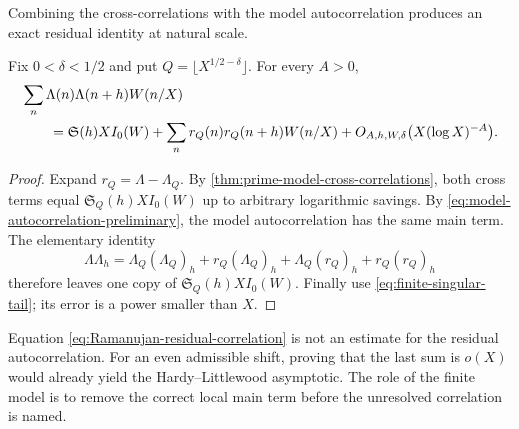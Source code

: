 Combining the cross-correlations with the model autocorrelation produces
an exact residual identity at natural scale.

\begin{theorem}
\label{thm:ramanujan-calibrated-correlation}
Fix $0<\delta<1/2$ and put $Q=\lfloor X^{1/2-\delta}\rfloor$.  For every
$A>0$,
\begin{align}
 &\sum_n\Lambda(n)\Lambda(n+h)W(n/X)
 \notag\\
 &\qquad={}
 \mathfrak S(h)XI_0(W)
 +\sum_nr_Q(n)r_Q(n+h)W(n/X)
 +O_{A,h,W,\delta}\bigl(X(\log X)^{-A}\bigr).
 \label{eq:Ramanujan-residual-correlation}
\end{align}
\end{theorem}

\begin{proof}
Expand $r_Q=\Lambda-\Lambda_Q$.  By
\cref{thm:prime-model-cross-correlations}, both cross terms equal
$\mathfrak S_Q(h)XI_0(W)$ up to arbitrary logarithmic savings.  By
\eqref{eq:model-autocorrelation-preliminary}, the model autocorrelation
has the same main term.  The elementary identity
\[
 \Lambda\Lambda_h
 =\Lambda_Q(\Lambda_Q)_h
 +r_Q(\Lambda_Q)_h+\Lambda_Q(r_Q)_h+r_Q(r_Q)_h
\]
therefore leaves one copy of $\mathfrak S_Q(h)XI_0(W)$.  Finally use
\eqref{eq:finite-singular-tail}; its error is a power smaller than $X$.
\end{proof}

Equation \eqref{eq:Ramanujan-residual-correlation} is not an estimate for
the residual autocorrelation.  For an even admissible shift, proving that
the last sum is $o(X)$ would already yield the Hardy--Littlewood
asymptotic.  The role of the finite model is to remove the correct local
main term before the unresolved correlation is named.
